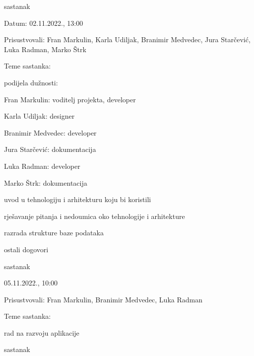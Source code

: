 \begin{packed_enum}
			\item  sastanak
			\item[] \begin{packed_item}
				\item Datum: 02.11.2022., 13:00
				\item Prisustvovali: Fran Markulin, Karla Udiljak, Branimir Medvedec, Jura Starčević, Luka Radman, Marko Štrk
				\item Teme sastanka:
				\begin{packed_item}
					\item  podijela dužnosti:
					\begin{packed_item}
						\item  Fran Markulin: voditelj projekta, developer
						\item  Karla Udiljak: designer
						\item  Branimir Medvedec: developer
						\item  Jura Starčević: dokumentacija
						\item  Luka Radman: developer
						\item  Marko Štrk: dokumentacija
					\end{packed_item}
					\item  uvod u tehnologiju i arhitekturu koju bi koristili
					\item  rješavanje pitanja i nedoumica oko tehnologije i arhitekture
					\item  razrada strukture baze podataka
					\item  ostali dogovori
				\end{packed_item}
			\end{packed_item}

			\item  sastanak
			
			\item[] \begin{packed_item}
				\item 05.11.2022., 10:00
				\item Prisustvovali: Fran Markulin, Branimir Medvedec, Luka Radman
				\item Teme sastanka: 
				\begin{packed_item}
					\item  rad na razvoju aplikacije
				\end{packed_item}
			\end{packed_item}

			\item  sastanak
			

\end{packed_enum}
